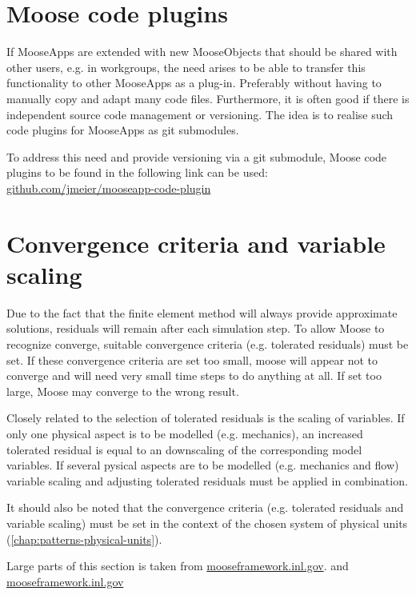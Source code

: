 \section{Moose code plugins}
\label{chap:patterns-code-plugins}

If MooseApps are extended with new MooseObjects that should be shared with
other users, e.g. in workgroups, the need arises to be able to transfer this
functionality to other MooseApps as a plug-in. Preferably without having to
manually copy and adapt many code files. Furthermore, it is often good if there
is independent source code management or versioning. The idea is to realise
such code plugins for MooseApps as git submodules.

To address this need and provide versioning via a git submodule, Moose code
plugins to be found in the following link can be used:
\href{https://github.com/jmeier/mooseapp-code-plugin}{github.com/jmeier/mooseapp-code-plugin}

\section{Convergence criteria and variable scaling}
\label{chap:patterns-converge-criteria-and-scaling}

Due to the fact that the finite element method will always provide approximate
solutions, residuals will remain after each simulation step. To allow Moose to
recognize converge, suitable convergence criteria (e.g. tolerated residuals)
must be set. If these convergence criteria are set too small, moose will appear
not to converge and will need very small time steps to do anything at all. If
set too large, Moose may converge to the wrong result.

Closely related to the selection of tolerated residuals is the scaling of
variables. If only one physical aspect is to be modelled (e.g. mechanics), an
increased tolerated residual is equal to an downscaling of the corresponding
model variables. If several pysical aspects are to be modelled (e.g. mechanics
and flow) variable scaling and adjusting tolerated residuals must be applied in
combination.

It should also be noted that the convergence criteria (e.g. tolerated residuals
and variable scaling) must be set in the context of the chosen system of
physical units (\autoref{chap:patterns-physical-units}).

Large parts of this section is taken from
\href{https://mooseframework.inl.gov/modules/porous_flow/convergence.html}{mooseframework.inl.gov}.
and
\href{https://mooseframework.inl.gov/modules/solid_mechanics/Convergence.html}{mooseframework.inl.gov}

